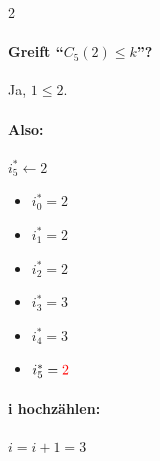 \begin{multicols}{2}
    \paragraph{Greift ``$C_5(2)\le k$''?} Ja, $1 \le 2$.
    \paragraph{Also:} $i_5^\ast \gets 2$
    \columnbreak
    \begin{itemize}
        \item $i_0^\ast = 2$
        \item $i_1^\ast = 2 $
        \item $i_2^\ast = 2 $
        \item $i_3^\ast = 3$
        \item $i_4^\ast = 3$
        \item $i_5^\ast = \textcolor{red}{2}$
    \end{itemize}
\end{multicols}

\paragraph{i hochzählen:} $i = i + 1 = 3$

